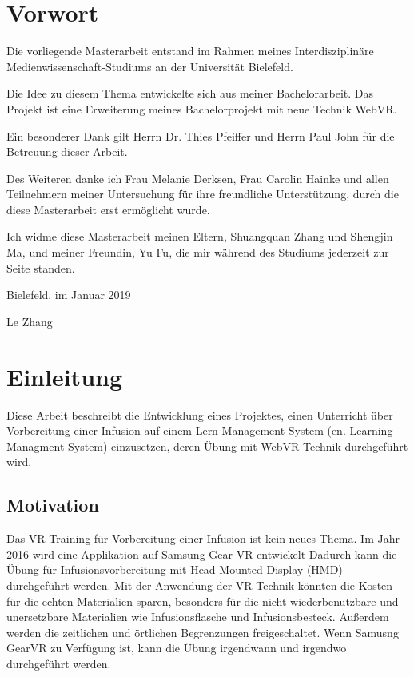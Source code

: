\chapter*{Vorwort}

Die vorliegende Masterarbeit entstand im Rahmen meines Interdisziplinäre Medienwissenschaft-Studiums an der Universität Bielefeld.
 
Die Idee zu diesem Thema entwickelte sich aus meiner Bachelorarbeit. Das Projekt ist eine Erweiterung meines Bachelorprojekt mit neue Technik WebVR.
 
Ein besonderer Dank gilt Herrn Dr. Thies Pfeiffer und Herrn Paul John für die Betreuung dieser Arbeit.
 
Des Weiteren danke ich Frau Melanie Derksen, Frau Carolin Hainke und allen Teilnehmern meiner Untersuchung für ihre freundliche Unterstützung, durch die diese Masterarbeit erst ermöglicht wurde.
 
Ich widme diese Masterarbeit meinen Eltern, Shuangquan Zhang und Shengjin Ma, und meiner Freundin, Yu Fu, die mir während des Studiums jederzeit zur Seite standen.

\vspace{5mm}
 
Bielefeld, im Januar 2019
 
Le Zhang

\chapter{Einleitung}

Diese Arbeit beschreibt die Entwicklung eines Projektes, einen Unterricht über Vorbereitung einer Infusion auf einem Lern-Management-System (en. Learning Managment System) einzusetzen, deren Übung mit WebVR Technik durchgeführt wird.

\section{Motivation}

Das VR-Training für Vorbereitung einer Infusion ist kein neues Thema. Im Jahr 2016 wird eine Applikation auf Samsung Gear VR entwickelt\citep{26}
Dadurch kann die Übung für Infusionsvorbereitung mit Head-Mounted-Display (HMD) durchgeführt werden. Mit der Anwendung der VR Technik könnten die Kosten für die echten Materialien sparen, besonders für die nicht wiederbenutzbare und unersetzbare Materialien wie Infusionsflasche und Infusionsbesteck. Außerdem werden die zeitlichen und örtlichen Begrenzungen freigeschaltet. Wenn Samusng GearVR zu Verfügung ist, kann die Übung irgendwann und irgendwo durchgeführt werden.


